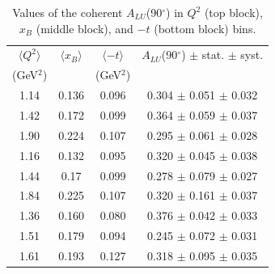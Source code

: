 \documentclass{article}
\begin{document}
\begin{table}[!h]
   \begin{center}
      \begin{tabular}{|c|c|c|c|}
         \hline
 $\langle Q^{2} \rangle$ & $\langle x_{B} \rangle$ & $\langle -t \rangle$  & $A_{LU}$(90$^{\circ}$) $\pm$ stat. $\pm$ syst.\\
 (GeV$^{2}$) &           & (GeV$^{2}$) &  \\
  \hline
  1.14  & 0.136 & 0.096 &  0.304  $\pm$ 0.051  $\pm$ 0.032 \\
  1.42  & 0.172 & 0.099 &  0.364  $\pm$ 0.059  $\pm$ 0.037 \\
  1.90  & 0.224 & 0.107 &  0.295  $\pm$ 0.061  $\pm$ 0.028 \\
  \hline 
  1.16  & 0.132 & 0.095 &  0.320  $\pm$ 0.045  $\pm$ 0.038 \\
  1.44  & 0.17  & 0.099 &  0.278  $\pm$ 0.079  $\pm$ 0.027 \\
  1.84  & 0.225 & 0.107 &  0.320  $\pm$ 0.161  $\pm$ 0.037 \\
  \hline 
  1.36  & 0.160 & 0.080 &  0.376  $\pm$ 0.042  $\pm$ 0.033 \\
  1.51  & 0.179 & 0.094 &  0.245  $\pm$ 0.072  $\pm$ 0.031 \\
  1.61  & 0.193 & 0.127 &  0.318  $\pm$ 0.095  $\pm$ 0.035 \\
  \hline
  \end{tabular}
  \caption{Values of the coherent $A_{LU}$(90$^{\circ}$) in $Q^2$ (top block), $x_B$ (middle block), and $-t$ (bottom block) bins. }
  \label{table:Coh_BSA_90}
  \end{center}
\end{table}

\end{document}
